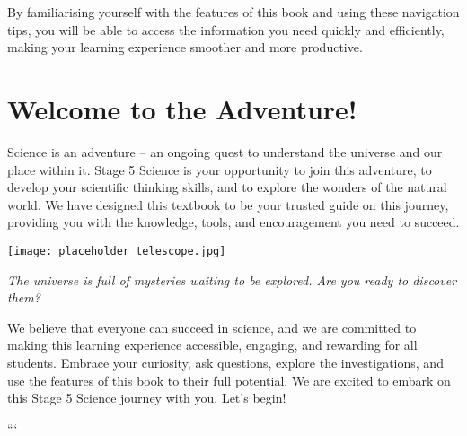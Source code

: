 By familiarising yourself with the features of this book and using these navigation tips, you will be able to access the information you need quickly and efficiently, making your learning experience smoother and more productive.

\FloatBarrier

\section{Welcome to the Adventure!}

Science is an adventure – an ongoing quest to understand the universe and our place within it.  Stage 5 Science is your opportunity to join this adventure, to develop your scientific thinking skills, and to explore the wonders of the natural world.  We have designed this textbook to be your trusted guide on this journey, providing you with the knowledge, tools, and encouragement you need to succeed.

\begin{marginfigure}[0pt]
\texttt{[image: placeholder\_telescope.jpg]}
\caption*{}
\textit{The universe is full of mysteries waiting to be explored. Are you ready to discover them?}
\end{marginfigure}

We believe that everyone can succeed in science, and we are committed to making this learning experience accessible, engaging, and rewarding for all students.  Embrace your curiosity, ask questions, explore the investigations, and use the features of this book to their full potential.  We are excited to embark on this Stage 5 Science journey with you.  Let's begin!

\FloatBarrier
```